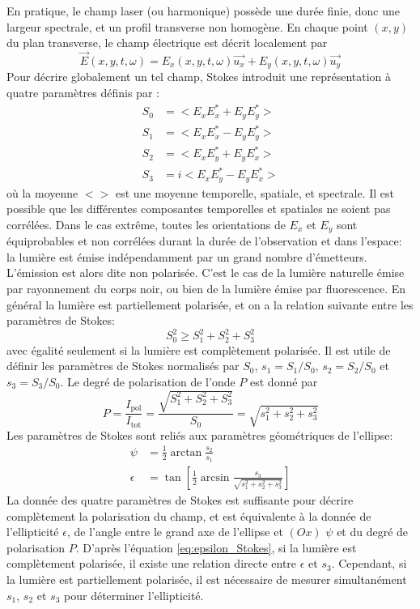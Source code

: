 En pratique, le champ laser (ou harmonique) possède une durée finie, donc une largeur spectrale, et un profil transverse non homogène. En chaque point $(x,y)$ du plan transverse, le champ électrique est décrit localement par
\begin{equation}
\vec{E}(x,y,t,\omega) = E_x(x,y,t,\omega) \vec{u_x} + E_y(x,y,t,\omega) \vec{u_y}
\end{equation}
Pour décrire globalement un tel champ, Stokes introduit une représentation à quatre paramètres définis par :
\begin{align}
S_0 & = <E_x E_x^* + E_y E_y^*> \\
S_1 & = <E_x E_x^* - E_y E_y^*> \\
S_2 & = <E_x E_y^* + E_y E_x^*>\\
S_3 & = i <E_x E_y^* - E_y E_x^*>
\end{align}
où la moyenne $< >$ est une moyenne temporelle, spatiale, et spectrale.
Il est possible que les différentes composantes temporelles et spatiales ne soient pas corrélées. Dans le cas extrême, toutes les orientations de $E_x$ et $E_y$ sont équiprobables et non corrélées durant la durée de l'observation et dans l'espace: la lumière est émise indépendamment par un grand nombre d'émetteurs. L'émission est alors dite non polarisée. C'est le cas de la lumière naturelle émise par rayonnement du corps noir, ou bien de la lumière émise par fluorescence. En général la lumière est partiellement polarisée, et on a la relation suivante entre les paramètres de Stokes:
\begin{equation}
S_0^2 \geqslant S_1^2 + S_2^2 + S_3^2
\end{equation}
avec égalité seulement si la lumière est complètement polarisée. Il est utile de définir les paramètres de Stokes normalisés par $S_0$, $s_1 = S_1 /S_0$, $s_2 = S_2 /S_0$ et $s_3 = S_3 /S_0$.
Le degré de polarisation de l'onde $P$ est donné par 
\begin{equation}
P = \frac{I_{\text{pol}}}{I_{\text{tot}}} = \frac{\sqrt{S_1^2 + S_2^2 + S_3^2}}{S_0} = \sqrt{s_1^2 + s_2^2 + s_3^2}
\label{eq:degrépolarisation}
\end{equation}
Les paramètres de Stokes sont reliés aux paramètres géométriques de l'ellipse:
\begin{align}
\psi & = \frac{1}{2} \arctan \frac{s_2}{s_1} \\
\epsilon & = \tan \left[ \frac{1}{2} \arcsin \frac{s_3}{\sqrt{s_1^2 + s_2^2 + s_3^2}} \right]
\label{eq:epsilon_Stokes}
\end{align}
La donnée des quatre paramètres de Stokes est suffisante pour décrire complètement la polarisation du champ, et est équivalente à la donnée de l'ellipticité $\epsilon$, de l'angle entre le grand axe de l'ellipse et $(Ox)$ $\psi$ et du degré de polarisation $P$. D'après l'équation \ref{eq:epsilon_Stokes}, si la lumière est complètement polarisée, il existe une relation directe entre $\epsilon$ et $s_3$. Cependant, si la lumière est partiellement polarisée, il est nécessaire de mesurer simultanément $s_1$, $s_2$ et $s_3$ pour déterminer l'ellipticité.

